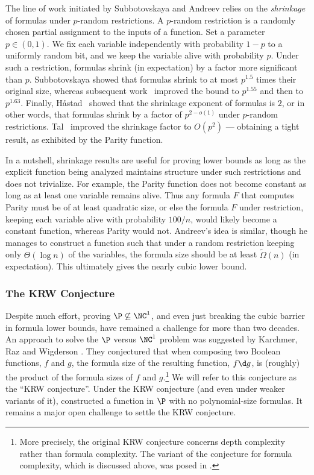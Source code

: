 \documentclass[11pt]{article}
\numberwithin{equation}{section}
\theoremstyle{definition}
\theoremstyle{plain}
\theoremstyle{definition}\newtheorem{notation}[theorem]{Notation}\theoremstyle{plain}
\begin{document}
The line of work initiated by Subbotovskaya and Andreev relies on
the \emph{shrinkage} of formulas under $p$-random restrictions. A
$p$-random restriction is a randomly chosen partial assignment to
the inputs of a function. Set a parameter $p\in(0,1)$. We fix each
variable independently with probability $1-p$ to a uniformly random
bit, and we keep the variable alive with probability $p$. Under such
a restriction, formulas shrink (in expectation) by a factor more significant
than $p$. Subbotovskaya showed that formulas shrink to
at most $p^{1.5}$ times their original size, whereas subsequent
%
work~\cite{PZ93,IN93}  %
improved the bound to $p^{1.55}$ and
then to  %
$p^{1.63}$.
%
%
%
%
Finally, H{\aa}stad~\cite{H98} showed that the shrinkage
exponent of formulas is $2$, or in other words, that 
formulas shrink by a factor of $p^{2-o(1)}$ under $p$-random restrictions.
Tal~\cite{T14} improved the shrinkage factor to $O(p^{2})$ ---
obtaining a tight result, as exhibited by the Parity function.

In a nutshell, shrinkage results are useful %
for  %
proving lower bounds
as long as the explicit function being analyzed maintains structure
under such restrictions and does not trivialize. For example, the
Parity function does not become constant as long as at least one variable
remains alive. Thus any formula $F$ that computes Parity must be
of at least quadratic size, or else the formula $F$ under restriction,
keeping each variable alive with probability $100/n$, would likely
become a constant function, whereas Parity would not. Andreev's idea
is similar, though he manages to construct a function such that under
a random restriction keeping only $\Theta(\log n)$ of the variables,
the formula size should be at least $\tilde{\Omega}(n)$ (in expectation).
This ultimately gives the nearly cubic lower bound.

%
\subsubsection{The KRW Conjecture}  %

Despite much effort, proving $\P\not\subseteq\NC^{1}$, and even just
breaking the \textsf{cubic barrier} in formula lower bounds, have
remained a challenge for more than two decades. An approach to solve
the $\P$ versus $\NC^{1}$ problem was suggested by Karchmer, Raz
and Wigderson \cite{KRW95}. They conjectured that when composing
two Boolean functions, $f$ and $g$, the formula size of the resulting
function, $f\d g$, is (roughly) the product of the formula sizes
of $f$ and $g$.\footnote{More precisely, the original KRW conjecture \cite{KRW95} concerns
depth complexity rather than formula complexity. The variant of the
conjecture for formula complexity, which is discussed above, was posed
in \cite{GMWW17}. } We will refer to this conjecture as the \textsf{``KRW conjecture''}.
Under the KRW conjecture (and even under weaker variants of it), \cite{KRW95}
constructed a function in $\P$ with no polynomial-size formulas.
It remains a major open challenge to settle the KRW conjecture.
\end{document}
